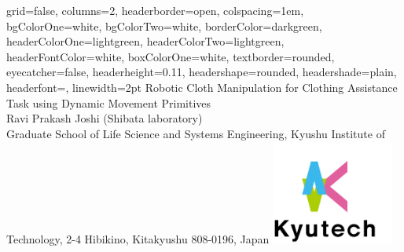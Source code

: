 \documentclass[a0paper,portrait]{baposter}
\begin{document}

\begin{poster}{
		grid=false,
		columns=2, %
		headerborder=open, %
		colspacing=1em, %
		bgColorOne=white, %
		bgColorTwo=white, %
		borderColor=darkgreen, %
		headerColorOne=lightgreen, %
		headerColorTwo=lightgreen, %
		headerFontColor=white, %
		boxColorOne=white, %
		textborder=rounded, %
		eyecatcher=false, %
		headerheight=0.11\textheight, %
		headershape=rounded, %
		headershade=plain,
		headerfont=\Large\textsf, %
		linewidth=2pt %
	}{}
	{\vspace{1em}
		\textsf %
		{Robotic Cloth Manipulation for Clothing Assistance Task using Dynamic Movement Primitives}
	} %
	{\sf\vspace{0.1em}\\
		Ravi Prakash Joshi (Shibata laboratory)
		\vspace{0.1em}\\
		\small{Graduate School of Life Science and Systems Engineering, Kyushu Institute of Technology, 2-4 Hibikino, Kitakyushu 808-0196, Japan}}
	{\includegraphics[trim={5mm 5mm 30mm 10mm}, clip, width=4cm]{logo}} %



\end{poster}
\end{document}
